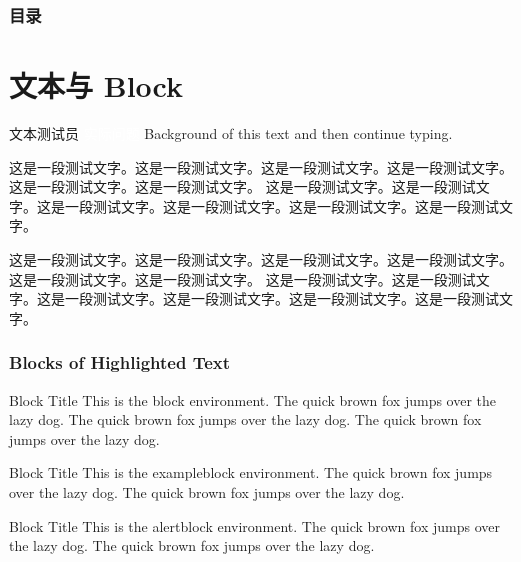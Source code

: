 \begin{frame}
    \frametitle{目录}
    \vskip -5.6pt
    \hspace*{1.5em}
    \parbox[t]{.95\textwidth}{
      \begin{minipage}[c][0.6\textheight]{\textwidth}
      \tableofcontents
      \end{minipage}
    }
\end{frame}
   


\section{文本与 Block}

\begin{frame}{文本测试员}
    \colorbox{green!50!blue}{\large \textcolor{white}{实际问题}}
    Background of \colorbox{BurntOrange}{this text} and then continue typing.

    这是一段测试文字。这是一段测试文字。这是一段测试文字。这是一段测试文字。这是一段测试文字。这是一段测试文字。
    这是一段测试文字。这是一段测试文字。这是一段测试文字。这是一段测试文字。这是一段测试文字。这是一段测试文字。

    \vspace{1ex}
    这是一段测试文字。这是一段测试文字。这是一段测试文字。这是一段测试文字。这是一段测试文字。这是一段测试文字。
    这是一段测试文字。这是一段测试文字。这是一段测试文字。这是一段测试文字。这是一段测试文字。这是一段测试文字。
\end{frame}


\begin{frame}
    \frametitle{Blocks of Highlighted Text}
    \begin{block}{Block Title}
    This is the block environment. The quick brown fox jumps over the lazy dog. The quick brown fox jumps over the lazy dog. The quick brown fox jumps over the lazy dog.
    \end{block}

    \begin{exampleblock}{Block Title}
    This is the exampleblock environment. The quick brown fox jumps over the lazy dog. The quick brown fox jumps over the lazy dog.
    \end{exampleblock}

    \begin{alertblock}{Block Title}
    This is the alertblock environment. The quick brown fox jumps over the lazy dog. The quick brown fox jumps over the lazy dog.
    \end{alertblock}
\end{frame}

